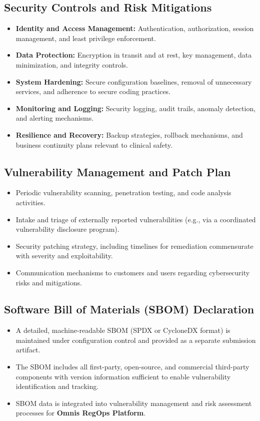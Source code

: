 \documentclass[11pt]{article}
\begin{document}
\subsection{Security Controls and Risk Mitigations}
\begin{itemize}
    \item \textbf{Identity and Access Management:} Authentication, authorization,
          session management, and least privilege enforcement.
    \item \textbf{Data Protection:} Encryption in transit and at rest, key
          management, data minimization, and integrity controls.
    \item \textbf{System Hardening:} Secure configuration baselines, removal of
          unnecessary services, and adherence to secure coding practices.
    \item \textbf{Monitoring and Logging:} Security logging, audit trails,
          anomaly detection, and alerting mechanisms.
    \item \textbf{Resilience and Recovery:} Backup strategies, rollback
          mechanisms, and business continuity plans relevant to clinical safety.
\end{itemize}

\subsection{Vulnerability Management and Patch Plan}
\begin{itemize}
    \item Periodic vulnerability scanning, penetration testing, and code
          analysis activities.
    \item Intake and triage of externally reported vulnerabilities (e.g., via a
          coordinated vulnerability disclosure program).
    \item Security patching strategy, including timelines for remediation
          commensurate with severity and exploitability.
    \item Communication mechanisms to customers and users regarding
          cybersecurity risks and mitigations.
\end{itemize}

\subsection{Software Bill of Materials (SBOM) Declaration}
\begin{itemize}
    \item A detailed, machine-readable SBOM (SPDX or CycloneDX format) is
          maintained under configuration control and provided as a separate
          submission artifact.
    \item The SBOM includes all first-party, open-source, and commercial
          third-party components with version information sufficient to enable
          vulnerability identification and tracking.
    \item SBOM data is integrated into vulnerability management and risk
          assessment processes for \textbf{Omnis RegOps Platform}.
\end{itemize}
\end{document}
